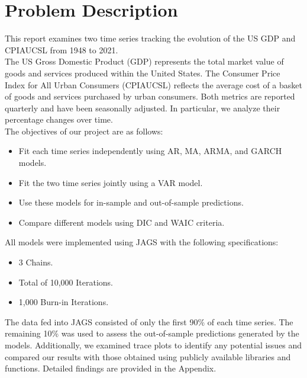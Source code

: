 \section{Problem Description}
This report examines two time series tracking the evolution of the US GDP and CPIAUCSL from 1948 to 2021. \\
The US Gross Domestic Product (GDP) represents the total market value of goods and services produced within the United States. The Consumer Price Index for All Urban Consumers (CPIAUCSL) reflects the average cost of a basket of goods and services purchased by urban consumers. Both metrics are reported quarterly and have been seasonally adjusted. In particular, we analyze their percentage changes over time. \\
The objectives of our project are as follows:
\begin{itemize}
    \item Fit each time series independently using AR, MA, ARMA, and GARCH models.
    \item Fit the two time series jointly using a VAR model.
    \item Use these models for in-sample and out-of-sample predictions.
    \item Compare different models using DIC and WAIC criteria.
\end{itemize}
All models were implemented using JAGS with the following specifications:
\begin{itemize}
    \item 3 Chains.
    \item Total of 10,000 Iterations.
    \item 1,000 Burn-in Iterations.
\end{itemize}
The data fed into JAGS consisted of only the first 90\% of each time series. The remaining 10\% was used to assess the out-of-sample predictions generated by the models.
Additionally, we examined trace plots to identify any potential issues and compared our results with those obtained using publicly available libraries and functions. Detailed findings are provided in the Appendix.